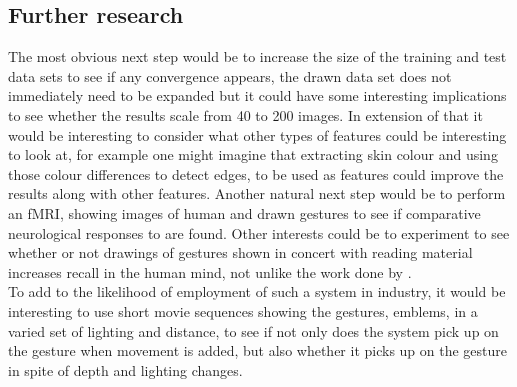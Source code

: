 \documentclass[11pt, a4paper]{article}
\begin{document}
\subsection{Further research}
The most obvious next step would be to increase the size of the training and test data sets to see if any convergence appears, the drawn data set does not immediately need to be expanded but it could have some interesting implications to see whether the results scale from 40 to 200 images. In extension of that it would be interesting to consider what other types of features could be interesting to look at, for example one might imagine that extracting skin colour and using those colour differences to detect edges, to be used as features could improve the results along with other features.
Another natural next step would be to perform an fMRI, showing images of human and drawn gestures to see if comparative neurological responses  to  are found. Other interests could be to experiment to see whether or not drawings of gestures shown in concert with reading material increases recall in the human mind, not unlike the work done by .\\
To add to the likelihood of employment of such a system in industry, it would be interesting to use short movie sequences showing the gestures, emblems, in a varied set of lighting and distance, to see if not only does the system pick up on the gesture when movement is added, but also whether it picks up on the gesture in spite of depth and lighting changes.


\end{document}
